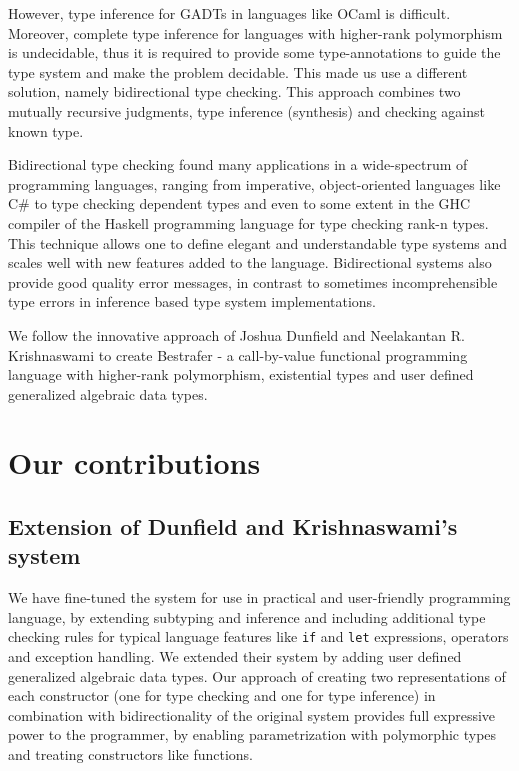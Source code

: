 \documentclass[declaration,shortabstract,english]{iithesis}
\begin{document}
However, type inference for GADTs in languages like OCaml is difficult\cite{ocaml-gadts}.
Moreover, complete type inference for languages with higher-rank polymorphism is undecidable, thus it is required to
provide some type-annotations to guide the type system and make the problem decidable. This made us use a different solution,
namely bidirectional type checking\cite{PierceTurnerBidType}. This approach combines two mutually recursive judgments,
type inference (synthesis) and checking against known type.

Bidirectional type checking found many applications in a wide-spectrum of programming languages, ranging from
imperative, object-oriented languages like C\# \cite{csharp2,csharp3} to type checking dependent types\cite{Coquand}
and even to some extent in the GHC compiler of the Haskell programming language for type checking rank-n types\cite{peytonjones}.
This technique allows one to define elegant and understandable type systems and scales well with new features added to the
language. Bidirectional systems also provide good quality error messages, in contrast to sometimes incomprehensible type errors
in inference based type system implementations.

We follow the innovative approach of Joshua Dunfield and Neelakantan R. Krishnaswami\cite{gadt-popl19} to create Bestrafer -
a call-by-value functional programming language with higher-rank polymorphism,
existential types and user defined generalized algebraic data types.
\section{Our contributions}
\subsection*{Extension of Dunfield and Krishnaswami's system}
We have fine-tuned the system for use in practical and user-friendly programming language, by
extending subtyping and inference and including additional type checking rules for typical language features like \verb+if+
and \verb+let+ expressions, operators and exception handling. We extended their system by adding user defined
generalized algebraic data types. Our approach of creating two representations of each constructor
(one for type checking and one for type inference) in combination with bidirectionality of the original
system provides full expressive power to the programmer, by enabling parametrization with polymorphic types and
treating constructors like functions.
\end{document}
